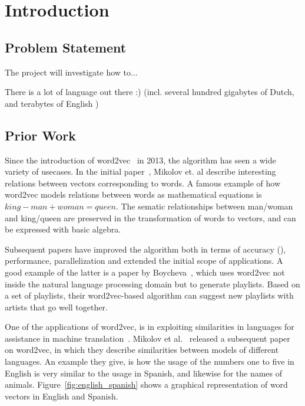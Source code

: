 \section{Introduction}


\subsection{Problem Statement}
The project will investigate how to...

There is a lot of language out there :) (incl. several hundred gigabytes of Dutch, and terabytes of English \cite{buck2014n})

\subsection{Prior Work}
\label{sec:prior_work}
Since the introduction of word2vec~\cite{mikolov2013efficient, mikolov2013distributed} in 2013, the algorithm has seen a wide variety of usecases. In the initial paper~\cite{mikolov2013efficient}, Mikolov et. al describe interesting relations between vectors corresponding to words. 
A famous example of how word2vec models relations between words as mathematical equations is $king - man + woman = queen$.
The sematic relationships between man/woman and king/queen are preserved in the transformation of words to vectors, and can be expressed with basic algebra.

Subsequent papers have improved the algorithm both in terms of accuracy (\cite{levy2014linguistic}), performance, parallelization and extended the initial scope of applications. A good example of the latter is a paper by Boycheva~\cite{boycheva2015distributional}, which uses word2vec not inside the natural language processing domain but to generate playlists. Based on a set of playlists, their word2vec-based algorithm can suggest new playlists with artists that go well together.

One of the applications of word2vec, is in exploiting similarities in languages for assistance in machine translation~\cite{wolf2014joint}. Mikolov et al.~\cite{mikolov2013exploiting} released a subsequent paper on word2vec, in which they describe similarities between models of different languages. An example they give, is how the usage of the numbers one to five in English is very similar to the usage in Spanish, and likewise for the names of animals. Figure~\ref{fig:english_spanish} shows a graphical representation of word vectors in English and Spanish.

